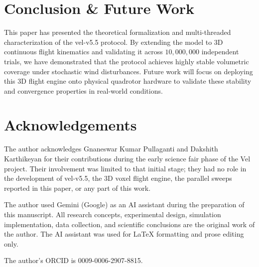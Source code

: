 \documentclass[letterpaper, 10pt, conference]{IEEEtran}
\begin{document}
\section{Conclusion \& Future Work}
\label{sec:conclusion}

This paper has presented the theoretical formalization and multi-threaded characterization of the vel-v5.5 protocol. By extending the model to 3D continuous flight kinematics and validating it across $10{,}000{,}000$ independent trials, we have demonstrated that the protocol achieves highly stable volumetric coverage under stochastic wind disturbances. Future work will focus on deploying this 3D flight engine onto physical quadrotor hardware to validate these stability and convergence properties in real-world conditions.

\section*{Acknowledgements}
The author acknowledges Gnaneswar Kumar Pullaganti and Dakshith Karthikeyan for their contributions during the early science fair phase of the Vel project. Their involvement was limited to that initial stage; they had no role in the development of vel-v5.5, the 3D voxel flight engine, the parallel sweeps reported in this paper, or any part of this work.

The author used Gemini (Google) as an AI assistant during the preparation of this manuscript. All research concepts, experimental design, simulation implementation, data collection, and scientific conclusions are the original work of the author. The AI assistant was used for LaTeX formatting and prose editing only.

The author's ORCID is 0009-0006-2907-8815.
\end{document}
